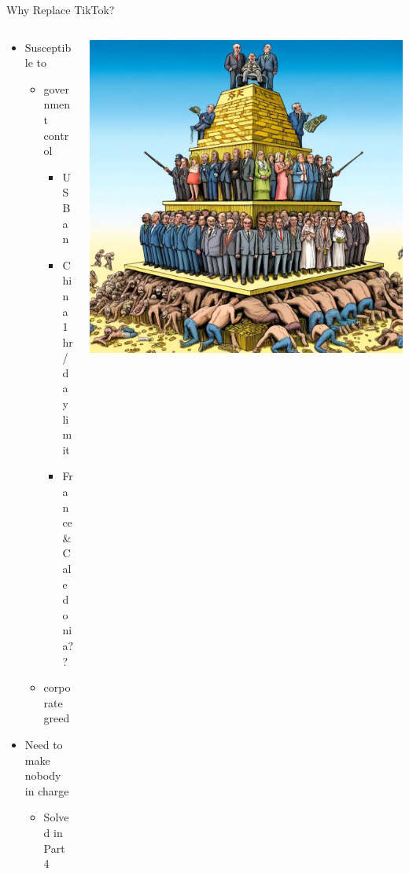 \documentclass[aspectratio=169]{beamer}
\begin{document}
\begin{frame}{Why Replace TikTok?}
\begin{columns}[T]
    \begin{column}[T]{0.5\textwidth}
        \begin{itemize}
            \item Susceptible to 
            \begin{itemize}
                \item government control 
                \begin{itemize}
                    \item US Ban %
                    \item China 1hr/day limit
                    \item France \& Caledonia??
                \end{itemize}
                \item corporate greed
            \end{itemize}
            \item Need to make nobody in charge
            \begin{itemize}
                \item Solved in Part 4
            \end{itemize}
        \end{itemize}
    \end{column}
    \begin{column}{0.5\textwidth}
        \includegraphics[height=0.8\textheight]{imgs/why_replace/power_pyramid.jpeg}
    \end{column}
\end{columns}
\end{frame}
\end{document}
